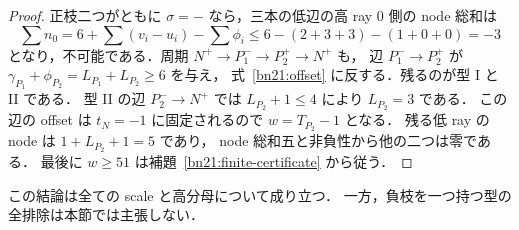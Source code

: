 \begin{proof}
正枝二つがともに $\sigma=-$ なら，三本の低辺の高 ray $0$ 側の node 総和は
\[
 \sum n_0=6+\sum(v_i-u_i)-\sum\phi_i
 \le6-(2+3+3)-(1+0+0)=-3
\]
となり，不可能である．周期 $N^+\to P_1^-\to P_2^+\to N^+$ も，
辺 $P_1^-\to P_2^+$ が
$\gamma_{P_1}+\phi_{P_2}=L_{P_1}+L_{P_2}\ge6$ を与え，
式~\eqref{bn21:offset} に反する．残るのが型 I と II である．
型 II の辺 $P_2^-\to N^+$ では $L_{P_2}+1\le4$ により $L_{P_2}=3$ である．
この辺の offset は $t_N=-1$ に固定されるので $w=T_{P_2}-1$ となる．
残る低 ray の node は $1+L_{P_2}+1=5$ であり，
node 総和五と非負性から他の二つは零である．
最後に $w\ge51$ は補題~\ref{bn21:finite-certificate} から従う．
\end{proof}

この結論は全ての scale と高分母について成り立つ．
一方，負枝を一つ持つ型の全排除は本節では主張しない．
